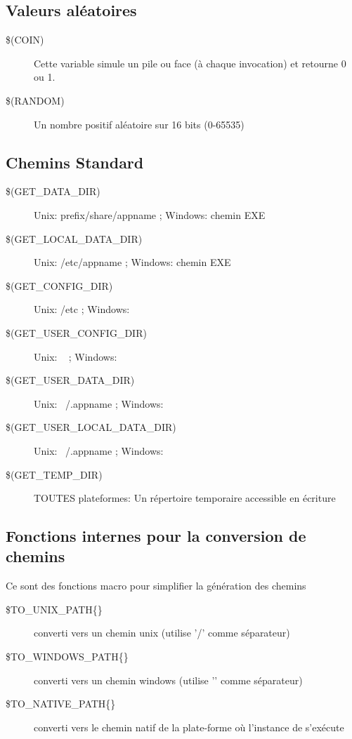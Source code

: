 \subsection{Valeurs aléatoires}

\begin{description}
\item[{\footnotesize \$(COIN)}] Cette variable simule un pile ou face (à chaque invocation) et retourne 0 ou 1.
\item[{\footnotesize \$(RANDOM)}] Un nombre positif aléatoire sur 16 bits (0-65535)
\end{description}

\subsection{Chemins Standard}

\begin{description}
\item[{\footnotesize \$(GET\_DATA\_DIR)}] Unix: prefix/share/appname ; Windows: chemin EXE
\item[{\footnotesize \$(GET\_LOCAL\_DATA\_DIR)}] Unix: /etc/appname ; Windows: chemin EXE
\item[{\footnotesize \$(GET\_CONFIG\_DIR)}] Unix: /etc ; Windows: 
\item[{\footnotesize \$(GET\_USER\_CONFIG\_DIR)}] Unix: ~ ; Windows: 
\item[{\footnotesize \$(GET\_USER\_DATA\_DIR)}] Unix: ~/.appname ; Windows: 
\item[{\footnotesize \$(GET\_USER\_LOCAL\_DATA\_DIR)}] Unix: ~/.appname ; Windows: 
\item[{\footnotesize \$(GET\_TEMP\_DIR)}] TOUTES plateformes: Un répertoire temporaire accessible en écriture
\end{description}

\subsection{Fonctions internes pour la conversion de chemins}
Ce sont des fonctions macro pour simplifier la génération des chemins 
\begin{description}
\item[{\footnotesize \$TO\_UNIX\_PATH\{\}}] converti vers un chemin unix (utilise '/' comme séparateur)
\item[{\footnotesize \$TO\_WINDOWS\_PATH\{\}}] converti vers un chemin windows (utilise '\osp' comme séparateur)
\item[{\footnotesize \$TO\_NATIVE\_PATH\{\}}] converti vers le chemin natif de la plate-forme où l'instance de \codeblocks s'exécute
\end{description}

